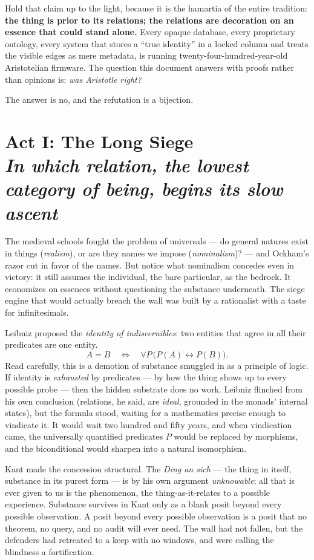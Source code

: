 \documentclass[11pt]{article}
\theoremstyle{plain}
\theoremstyle{definition}
\theoremstyle{remark}
\newcommand{\act}[2]{\section{#1 \\ {\normalsize\normalfont\itshape #2}}}
\begin{document}
Hold that claim up to the light, because it is the hamartia of the entire tradition: \textbf{the thing is prior to its relations; the relations are decoration on an essence that could stand alone.} Every opaque database, every proprietary ontology, every system that stores a ``true identity'' in a locked column and treats the visible edges as mere metadata, is running twenty-four-hundred-year-old Aristotelian firmware. The question this document answers with proofs rather than opinions is: \emph{was Aristotle right?}

The answer is no, and the refutation is a bijection.

\act{Act I: The Long Siege}{In which relation, the lowest category of being, begins its slow ascent}

The medieval schools fought the problem of universals --- do general natures exist in things (\emph{realism}), or are they names we impose (\emph{nominalism})? --- and Ockham's razor cut in favor of the names. But notice what nominalism concedes even in victory: it still assumes the individual, the bare particular, as the bedrock. It economizes on essences without questioning the substance underneath. The siege engine that would actually breach the wall was built by a rationalist with a taste for infinitesimals.

Leibniz proposed the \emph{identity of indiscernibles}: two entities that agree in all their predicates are one entity.
\[
A = B \quad\Longleftrightarrow\quad \forall P\,\bigl(P(A) \leftrightarrow P(B)\bigr).
\]
Read carefully, this is a demotion of substance smuggled in as a principle of logic. If identity is \emph{exhausted} by predicates --- by how the thing shows up to every possible probe --- then the hidden substrate does no work. Leibniz flinched from his own conclusion (relations, he said, are \emph{ideal}, grounded in the monads' internal states), but the formula stood, waiting for a mathematics precise enough to vindicate it. It would wait two hundred and fifty years, and when vindication came, the universally quantified predicates $P$ would be replaced by morphisms, and the biconditional would sharpen into a natural isomorphism.

Kant made the concession structural. The \emph{Ding an sich} --- the thing in itself, substance in its purest form --- is by his own argument \emph{unknowable}; all that is ever given to us is the phenomenon, the thing-as-it-relates to a possible experience. Substance survives in Kant only as a blank posit beyond every possible observation. A posit beyond every possible observation is a posit that no theorem, no query, and no audit will ever need. The wall had not fallen, but the defenders had retreated to a keep with no windows, and were calling the blindness a fortification.
\end{document}
